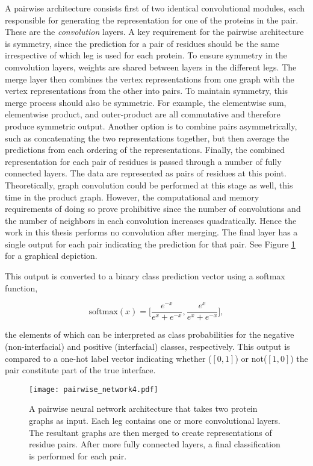 A pairwise architecture consists first of two identical convolutional modules, each responsible for generating the representation for one of the proteins in the pair.
These are the \emph{convolution} layers.
A key requirement for the pairwise architecture is symmetry, since the prediction for a pair of residues should be the same irrespective of which leg is used for each protein.
To ensure symmetry in the comvolution layers, weights are shared between layers in the different legs.
The merge layer then combines the vertex representations from one graph with the vertex representations from the other into pairs.
To maintain symmetry, this merge process should also be symmetric.
For example, the elementwise sum, elementwise product, and outer-product are all commutative and therefore produce symmetric output.
Another option is to combine pairs asymmetrically, such as concatenating the two representations together, but then average the predictions from each ordering of the representations.
Finally, the combined representation for each pair of residues is passed through a number of fully connected layers.
The data are represented as pairs of residues at this point. 
Theoretically, graph convolution could be performed at this stage as well, this time in the product graph.
However, the computational and memory requirements of doing so prove prohibitive since the number of convolutions and the number of neighbors in each convolution increases quadratically.
Hence the work in this thesis performs no convolution after merging.
The final layer has a single output for each pair indicating the prediction for that pair.
See Figure \ref{fig:pairwise_arch1} for a graphical depiction.

This output is converted to a binary class prediction vector using a softmax function, 

\begin{equation}
\text{softmax}(x) = \bigg[ \frac{e^{-x}}{e^{x} + e^{-x}} , \frac{e^{x}}{e^{x} + e^{-x}} \bigg],
\label{eq:softmax}
\end{equation}

\noindent
the elements of which can be interpreted as class probabilities for the negative (non-interfacial) and positive (interfacial) classes, respectively.
This output is compared to a one-hot label vector indicating whether \big($[0, 1]$\big) or not\big($[1, 0]$\big) the pair constitute part of the true interface. 

\begin{figure}
	\texttt{[image: pairwise\_network4.pdf]}
	\caption{A pairwise neural network architecture that takes two protein graphs as input. Each leg contains one or more convolutional layers. The resultant graphs are then merged to create representations of residue pairs. After more fully connected layers, a final classification is performed for each pair.}
	\label{fig:pairwise_arch1}
\end{figure}


